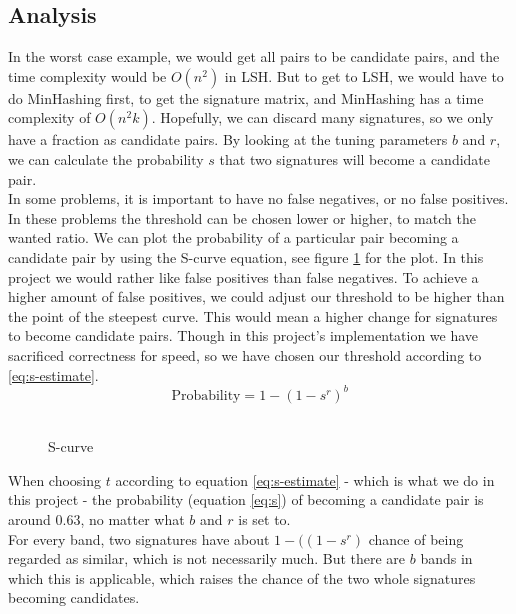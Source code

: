 \documentclass[a4paper,11pt]{article}
\begin{document}
\subsection{Analysis}
In the worst case example, we would get all pairs to be candidate pairs, and the time complexity would be $O(n^2)$ in LSH. But to get to LSH, we would have to do MinHashing first, to get the signature matrix, and MinHashing has a time complexity of $O(n^2k)$. Hopefully, we can discard many signatures, so we only have a fraction as candidate pairs. By looking at the tuning parameters $b$ and $r$, we can calculate the probability $s$ that two signatures will become a candidate pair. \\

In some problems, it is important to have no false negatives, or no false positives. In these problems the threshold can be chosen lower or higher, to match the wanted ratio. We can plot the probability of a particular pair becoming a candidate pair by using the S-curve equation, see figure \ref{fig:scurve} for the plot. In this project we would rather like false positives than false negatives. To achieve a higher amount of false positives, we could adjust our threshold to be higher than the point of the steepest curve. This would mean a higher change for signatures to become candidate pairs. Though in this project's implementation we have sacrificed correctness for speed, so we have chosen our threshold according to \ref{eq:s-estimate}. \\

\begin{equation}
    \text {Probability} = 1 - (1 - s^r)^b 
    \label{eq:s}
\end{equation}\\

\begin{figure}[!htpb]
    \begin{center}
        
        \caption{S-curve}
        \label{fig:scurve}
    \end{center}
\end{figure}

When choosing $t$ according to equation \ref{eq:s-estimate} - which is what we do in this project - the probability (equation \ref{eq:s}) of becoming a candidate pair is around $0.63$, no matter what $b$ and $r$ is set to. \\

For every band, two signatures have about $1 - (\left(1-s^r \right)$ chance of being regarded as similar, which is not necessarily much. But there are $b$ bands in which this is applicable, which raises the chance of the two whole signatures becoming candidates.
\end{document}
